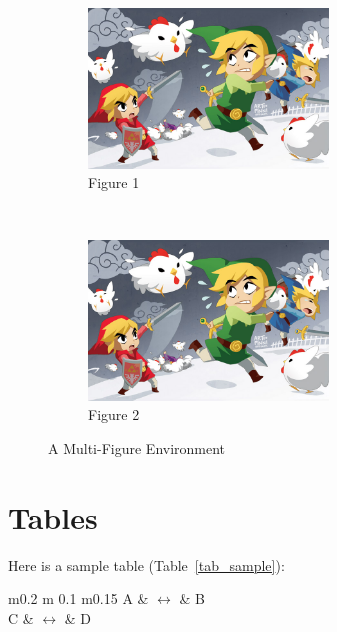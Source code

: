 \begin{figure}[ht]
	\centering
	\begin{subfigure}[t]{\textwidth}
		\centering
		
\includegraphics[width=0.7\textwidth]{figures/Sample/tumblr_static_eaceks0rfxsss8o4swscw40wo.jpg}
		\caption{Figure 1}
		\label{fig_multienv_1}
	\end{subfigure}
	~
	\begin{subfigure}[t]{\textwidth}
		\centering
		
\includegraphics[width=0.7\textwidth]{figures/Sample/tumblr_static_eaceks0rfxsss8o4swscw40wo.jpg}
		\caption{Figure 2}
		\label{fig_multienv_2}
	\end{subfigure}
	
	\caption{A Multi-Figure Environment}
	\label{fig_multienv}
\end{figure}

\section{Tables}

Here is a sample table (Table~\ref{tab_sample}):

	\begin{table}[ht]
	\centering
	\begin{tabular}{ m{} m {0.1\textwidth} m{0.15\textwidth} }
		\toprule
		A & $\longleftrightarrow$ & B \\
		C & $\longleftrightarrow$ & D \\
		\bottomrule	
	\end{tabular}	
	\caption{A sample table}	
	\label{tab_sample}
\end{table}

